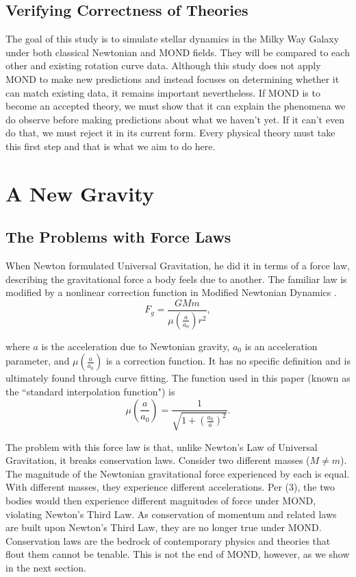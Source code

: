 \documentclass[11pt, twocolumn]{article}
\begin{document}
    \subsection*{Verifying Correctness of Theories}
    The goal of this study is to simulate stellar dynamics in the Milky Way Galaxy under both classical Newtonian and MOND fields. They will be compared to each other and existing rotation curve data. Although this study does not apply MOND to make new predictions and instead focuses on determining whether it can match existing data, it remains important nevertheless. If MOND is to become an accepted theory, we must show that it can explain the phenomena we do observe before making predictions about what we haven't yet. If it can't even do that, we must reject it in its current form. Every physical theory must take this first step and that is what we aim to do here.

    
    \section*{A New Gravity}
    \subsection*{The Problems with Force Laws}
    When Newton formulated Universal Gravitation, he did it in terms of a force law, describing the gravitational force a body feels due to another. The familiar law is modified by a nonlinear correction function in Modified Newtonian Dynamics \parencite{sanders_modified_2002}.
    \begin{equation}
    F_g = \frac{GMm}{\mu(\frac{a}{a_0})r^2},
    \end{equation}
    
    where $a$ is the acceleration due to Newtonian gravity, $a_0$ is an acceleration parameter, and $\mu(\frac{a}{a_0})$ is a correction function. It has no specific definition and is ultimately found through curve fitting. The function used in this paper (known as the ``standard interpolation function") is
    \begin{equation}
    \mu\left(\frac{a}{a_0}\right) = \frac{1}{\sqrt{1 + (\frac{a_0}{a})^2}}.
    \end{equation}
    
    The problem with this force law is that, unlike Newton's Law of Universal Gravitation, it breaks conservation laws. Consider two different masses ($M \neq m$). The magnitude of the Newtonian gravitational force experienced by each is equal. With different masses, they experience different accelerations. Per (3), the two bodies would then experience different magnitudes of force under MOND, violating Newton's Third Law. As conservation of momentum and related laws are built upon Newton's Third Law, they are no longer true under MOND. Conservation laws are the bedrock of contemporary physics and theories that flout them cannot be tenable. This is not the end of MOND, however, as we show in the next section.
    
\end{document}
